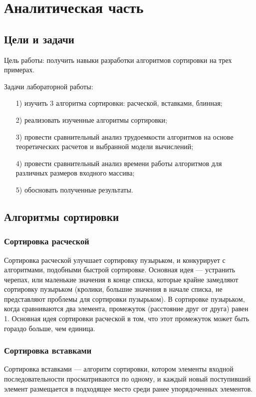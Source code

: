 \chapter{Аналитическая часть}

\section{Цели и задачи}

Цель работы: получить навыки разработки алгоритмов сортировки на трех примерах.

Задачи лабораторной работы:
\begin{enumerate}
	\item[1)] изучить 3 алгоритма сортировки: расческой, вставками, блинная;
	\item[2)] реализовать изученные алгоритмы сортировки;
	\item[3)] провести сравнительный анализ трудоемкости алгоритмов на основе теоретических расчетов и выбранной модели вычислений;
	\item[4)] провести сравнительный анализ времени работы алгоритмов для различных размеров входного массива;
	\item[5)] обосновать полученные результаты.
\end{enumerate}

\section{Алгоритмы сортировки}

\subsection{Сортировка расческой}
Сортировка расческой улучшает сортировку пузырьком, и конкурирует с алгоритмами, подобными быстрой сортировке.
Основная идея --- устранить черепах, или маленькие значения в конце списка, которые крайне замедляют сортировку пузырьком (кролики, большие значения в начале списка, не представляют проблемы для сортировки пузырьком).
В сортировке пузырьком, когда сравниваются два элемента, промежуток (расстояние друг от друга) равен 1.
Основная идея сортировки расческой в том, что этот промежуток может быть гораздо больше, чем единица.

\subsection{Сортировка вставками}
Сортировка вставками --- алгоритм сортировки, котором элементы входной последовательности просматриваются по одному, и каждый новый поступивший элемент размещается в подходящее место среди ранее упорядоченных элементов.

